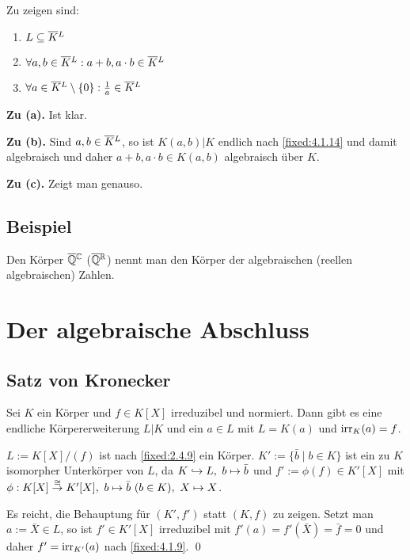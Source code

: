 \proof Zu zeigen sind:
\begin{enumerate}[label=(\alph*)]
	\item
		$L \subseteq \barsmash KL$
		
	\item
		$\forall a,b \in \barsmash KL : a+b, a \cdot b \in \barsmash KL$
		
	\item
		$\forall a \in \barsmash KL \setminus \{0\} : \frac{1}{a} \in \barsmash KL$
\end{enumerate}

\textbf{Zu (a).} Ist klar.

\textbf{Zu (b).} Sind $a,b \in \barsmash KL$, so ist $K(a,b)|K$ endlich nach \ref{fixed:4.1.14} und damit algebraisch und daher $a+b,a \cdot b \in K(a,b)$ algebraisch über $K$.

\textbf{Zu (c).} Zeigt man genauso.

\subsection{Beispiel} Den Körper $\barsmash \Q\C$ ($\barsmash \Q\R$) nennt man den Körper der algebraischen (reellen algebraischen) Zahlen.

\section{Der algebraische Abschluss}

\subsection{Satz von Kronecker} Sei $K$ ein Körper und $f \in K[X]$ irreduzibel und normiert. Dann gibt es eine endliche Körpererweiterung $L|K$ und ein $a \in L$ mit $L =  K(a)$ und $\operatorname{irr}_K(a) = f$.


$L := K[X]/(f)$ ist nach \ref{fixed:2.4.9} ein Körper. $K' := \{\bar b \mid b \in K\}$ ist ein zu $K$ isomorpher Unterkörper von $L$, da $K \MAPmono L,~b \mapsto \bar b$ und $f' := \phi(f) \in K'[X]$ mit $\phi : K[X] \overset{\cong}{\rightarrow} K'[X],~ b \mapsto \bar b~(b \in K),~X \mapsto X$.

Es reicht, die Behauptung für $(K',f')$ statt $(K,f)$ zu zeigen. Setzt man $a := \bar X \in L$, so ist $f' \in K'[X]$ irreduzibel mit $f'(a) = f'(\bar X) = \bar f = 0$ und daher $f' = \operatorname{irr}_{K'}(a)$ nach \ref{fixed:4.1.9}. \qed

